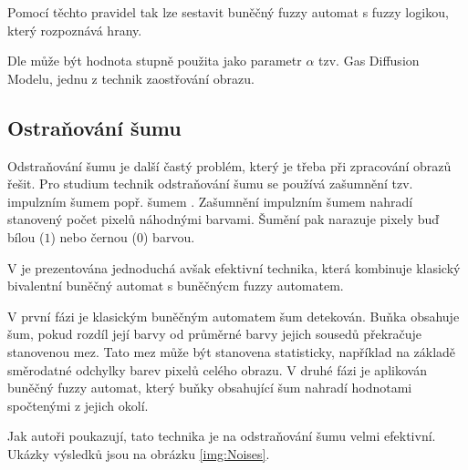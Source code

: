 \documentclass[a4paper,10pt]{article}
\begin{document}
Pomocí těchto pravidel tak lze sestavit buněčný fuzzy automat s fuzzy logikou, který rozpoznává hrany. 

Dle \cite{MarMeySol-HybMetGasDifModFuzCelAutImSha} může být hodnota stupně  použita jako parametr $\alpha$ tzv. Gas Diffusion Modelu, jednu z technik zaostřování obrazu.

\subsection{Ostraňování šumu} \label{subs:NoisRem}
Odstraňování šumu je další častý problém, který je třeba při zpracování obrazů řešit. Pro studium technik odstraňování šumu se používá zašumnění tzv. impulzním šumem popř. šumem . Zašumnění impulzním šumem nahradí stanovený počet pixelů náhodnými barvami. Šumění  pak narazuje pixely buď bílou ($1$) nebo černou ($0$) barvou.

V \cite{SadRetKam-EfMetImpNoiRedImFuzCelAut} je prezentována jednoduchá avšak efektivní technika, která kombinuje klasický bivalentní buněčný automat s buněčnýcm fuzzy automatem. 

V první fázi je klasickým buněčným automatem šum detekován. Buňka obsahuje šum, pokud rozdíl její barvy od průměrné barvy jejich sousedů překračuje stanovenou mez. Tato mez může být stanovena statisticky, například na základě směrodatné odchylky barev pixelů celého obrazu. V druhé fázi je aplikován buněčný fuzzy automat, který buňky obsahující šum nahradí hodnotami spočtenými z jejich okolí. 

Jak autoři poukazují, tato technika je na odstraňování šumu velmi efektivní. Ukázky výsledků jsou na obrázku \ref{img:Noises}. 
\end{document}
